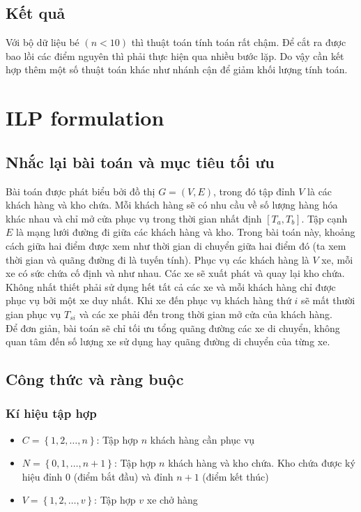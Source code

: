 \documentclass[12pt,a4paper]{article}\author{Nguyễn Nho Dũng}
\let\svsection\section
\def\section{\setcounter{figure}{0}\svsection}
\newcommand{\taphop}[1]{\left\{#1\right\}}
\newcommand{\ngoacvuong}[1]{\left[#1\right]}
\begin{document}
\subsection{Kết quả}
Với bộ dữ liệu bé $(n<10)$ thì thuật toán tính toán rất chậm. Để cắt ra được bao lồi các điểm nguyên thì phải thực hiện qua nhiều bước lặp. Do vậy cần kết hợp thêm một số thuật toán khác như nhánh cận để giảm khối lượng tính toán.
\newpage\section{ILP formulation}
\subsection{Nhắc lại bài toán và mục tiêu tối ưu}
Bài toán được phát biểu bởi đồ thị $G = (V, E)$, trong đó tập đỉnh $V$ là các khách hàng và kho chứa. Mỗi khách hàng sẽ có nhu cầu về số lượng hàng hóa khác nhau và chỉ mở cửa phục vụ trong thời gian nhất định $\ngoacvuong{T_a, T_b}$. Tập cạnh $E$ là mạng lưới đường đi giữa các khách hàng và kho. Trong bài toán này, khoảng cách giữa hai điểm được xem như thời gian di chuyển giữa hai điểm đó (ta xem thời gian và quãng đường đi là tuyến tính). Phục vụ các khách hàng là $V$ xe, mỗi xe có sức chứa cố định và như nhau. Các xe sẽ xuất phát và quay lại kho chứa. Không nhất thiết phải sử dụng hết tất cả các xe và mỗi khách hàng chỉ được phục vụ bởi một xe duy nhất. Khi xe đến phục vụ khách hàng thứ $i$ sẽ mất thười gian phục vụ $T_{si}$ và các xe phải đến trong thời gian mở cửa của khách hàng.\\[5pt]
Để đơn giản, bài toán sẽ chỉ tối ưu tổng quãng đường các xe di chuyển, không quan tâm đến số lượng xe sử dụng hay quãng đường di chuyển của từng xe.
\subsection{Công thức và ràng buộc}
\subsubsection*{Kí hiệu tập hợp}
\begin{itemize}
	\item $C = \taphop{1, 2, \ldots, n}$: Tập hợp $n$ khách hàng cần phục vụ
	\item $N = \taphop{0, 1, \ldots, n+1}$: Tập hợp $n$ khách hàng và kho chứa. Kho chứa được ký hiệu đỉnh $0$ (điểm bắt đầu) và đỉnh $n+1$ (điểm kết thúc)
	\item $V = \taphop{1, 2, \ldots, v}$: Tập hợp $v$ xe chở hàng
\end{itemize}
\end{document}
